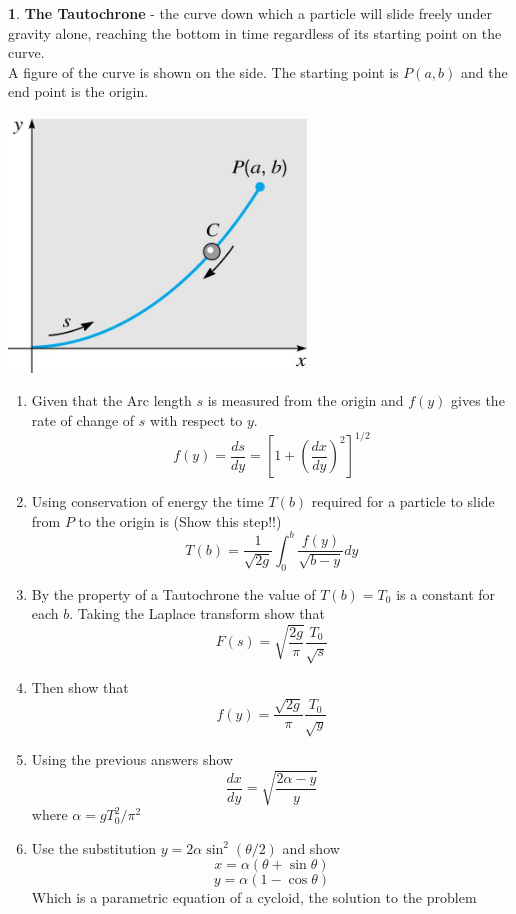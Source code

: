 \documentclass[11pt]{article}
\theoremstyle{definition}
\newtheorem{q}{}
\begin{document}
\begin{multicols*}{2}
		\begin{q}
			\textbf{The Tautochrone} - the curve down which a particle will slide freely under gravity alone, reaching the bottom in time regardless of its starting point on the curve. \\
			A figure of the curve is shown on the side. The starting point is $ P(a,b) $ and the end point is the origin. \\ 
			\begin{center}
				\includegraphics[width=8cm]{taut} 
			\end{center}
			\begin{enumerate}
				\item Given that the Arc length $ s $ is measured from the origin and $ f(y) $ gives the rate of change of $ s $ with respect to $ y $. 
			\[ f(y) = \dfrac{ds}{dy} = \left[1 + \left( \dfrac{dx}{dy} \right)^2 \right]^{1/2} \]
				\item Using conservation of energy the time $ T(b) $ required for a particle to slide from $ P $ to the origin is (Show this step!!)
				\[ T(b) = \dfrac{1}{\sqrt{2g}} \int_{0}^{b}\dfrac{f(y)}{\sqrt{b-y}} dy\]
			\item By the property of a Tautochrone the value of $ T(b) = T_0 $ is a constant for each $ b $. Taking the Laplace transform show that 
			\[ F(s) = \sqrt{\dfrac{2g}{\pi}} \dfrac{T_0}{\sqrt{s}} \] 
			\item Then show that 
			\[ f(y) = \dfrac{\sqrt{2g}}{\pi} \dfrac{T_0}{\sqrt{y}}\] 
			\item Using the previous answers show 
			\[ \dfrac{dx}{dy} = \sqrt{\dfrac{2 \alpha - y}{y}} \]
			where $ \alpha = gT_0^2/\pi^2 $ 
			\item Use the substitution $ y = 2 \alpha \sin ^2 (\theta / 2)$ and show 
			\[ x = \alpha (\theta + \sin \theta) \] \[ y = \alpha (1-\cos \theta)\] 
			Which is a parametric equation of a cycloid, the solution to the problem
			\end{enumerate}
			
			
		\end{q}
	\end{multicols*}
\end{document}
